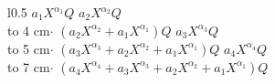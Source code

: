 \begin{wrapfigure}{l}{0.5\textwidth} %
\hspace*{140.pt}\underline{$a_{1}X^{\alpha _1}Q$}\newline
\hspace*{100.pt}\underline{$a_{2}X^{\alpha _2}Q$}\\
\hspace*{80.pt}\hbox to 4 cm{\qquad\leaders\hbox{$\cdot$}\hfill }\newline
\hspace*{100.pt}\underline{$(a_{2}X^{\alpha _2} + a_{1}X^{\alpha _1})Q$}\newline
\hspace*{60.pt}\underline{$a_{3}X^{\alpha _3}Q$}\\
\hspace*{40.pt}\hbox to 5 cm{\qquad\leaders\hbox{$\cdot$}\hfill } \newline
\hspace*{60.pt}\underline{$(a_{3}X^{\alpha _3} + a_{2}X^{\alpha _2} + a_{1}X^{\alpha _1})Q$} \newline
\hspace*{20.pt}\underline{$a_{4}X^{\alpha _4}Q$}\\
\hbox to 7 cm{\qquad\leaders\hbox{$\cdot$}\hfill }
\hspace*{20.pt}\underline{$(a_{4}X^{\alpha _4} + a_{3}X^{\alpha _3} + a_{2}X^{\alpha _2} + a_{1}X^{\alpha _1})Q$}\newline

\end{wrapfigure}


